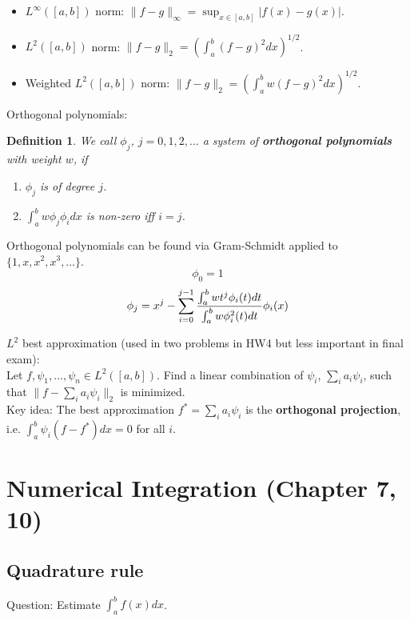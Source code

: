 \documentclass[20pt]{article} %
\theoremstyle{break}
\newtheorem{definition}{Definition}[section]
\begin{document}
\begin{itemize}
\item $L^\infty([a, b])$ norm: $\|f-g\|_{\infty}=\sup_{x\in [a, b]}|f(x)-g(x)|$.
\item $L^2([a, b])$ norm: $\|f-g\|_2=(\int_a^b(f-g)^2dx)^{1/2}$.
\item Weighted $L^2([a, b])$ norm: $\|f-g\|_2=(\int_a^bw(f-g)^2dx)^{1/2}$.
\end{itemize}

\newpage

Orthogonal polynomials:

\begin{definition}We call $\phi_j$, $j=0, 1, 2, \dots$ a system of {\bf orthogonal polynomials} with weight $w$, if 
  \begin{enumerate}
   \item $\phi_j$ is of degree $j$.
   \item $\int_a^bw\phi_j\phi_idx$ is non-zero iff $i=j$.
  \end{enumerate}
\end{definition}

Orthogonal polynomials can be found via Gram-Schmidt applied to $\{1, x, x^2, x^3, \dots\}$.
  \[\phi_0=1\]
  \[\phi_j=x^j-\sum_{i=0}^{j-1}{\int_a^b wt^j\phi_i(t)dt\over \int_a^b w\phi_i^2(t)dt}\phi_i(x)\]
  
\newpage

$L^2$ best approximation (used in two problems in HW4 but less important in final exam):\\

Let $f, \psi_1, \dots, \psi_n\in L^2([a, b])$. Find a linear combination of $\psi_i$, $\sum_ia_i\psi_i$, such that $\|f-\sum_ia_i\psi_i\|_2$ is minimized.\\

Key idea: The best approximation $f^*=\sum_ia_i\psi_i$ is the {\bf orthogonal projection}, i.e. $\int_a^b\psi_i(f-f^*)dx=0$ for all $i$.

\newpage

\section{Numerical Integration (Chapter 7, 10)}

\subsection{Quadrature rule}

Question: Estimate $\int_a^bf(x)dx$.\\
\end{document}
